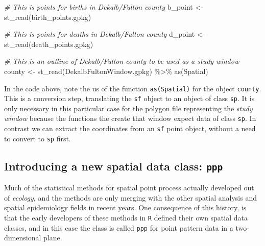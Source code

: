 \documentclass[
]{book}
\newenvironment{Shaded}{\begin{snugshade}}{\end{snugshade}}
\newcommand{\CommentTok}[1]{\textcolor[rgb]{0.56,0.35,0.01}{\textit{#1}}}
\newcommand{\FunctionTok}[1]{\textcolor[rgb]{0.00,0.00,0.00}{#1}}
\newcommand{\NormalTok}[1]{#1}
\newcommand{\OtherTok}[1]{\textcolor[rgb]{0.56,0.35,0.01}{#1}}
\newcommand{\SpecialCharTok}[1]{\textcolor[rgb]{0.00,0.00,0.00}{#1}}
\newcommand{\StringTok}[1]{\textcolor[rgb]{0.31,0.60,0.02}{#1}}
\begin{document}
\begin{Shaded}
\begin{Highlighting}[]
\CommentTok{\# This is points for births in Dekalb/Fulton county}
\NormalTok{b\_point }\OtherTok{\textless{}{-}} \FunctionTok{st\_read}\NormalTok{(}\StringTok{\textquotesingle{}birth\_points.gpkg\textquotesingle{}}\NormalTok{)}

\CommentTok{\# This is points for deaths in Dekalb/Fulton county}
\NormalTok{d\_point }\OtherTok{\textless{}{-}} \FunctionTok{st\_read}\NormalTok{(}\StringTok{\textquotesingle{}death\_points.gpkg\textquotesingle{}}\NormalTok{) }

\CommentTok{\# This is an outline of Dekalb/Fulton county to be used as a study \textquotesingle{}window\textquotesingle{}}
\NormalTok{county }\OtherTok{\textless{}{-}} \FunctionTok{st\_read}\NormalTok{(}\StringTok{\textquotesingle{}DekalbFultonWindow.gpkg\textquotesingle{}}\NormalTok{) }\SpecialCharTok{\%\textgreater{}\%}
  \FunctionTok{as}\NormalTok{(}\StringTok{\textquotesingle{}Spatial\textquotesingle{}}\NormalTok{)}
\end{Highlighting}
\end{Shaded}

In the code above, note the us of the function \texttt{as(\textquotesingle{}Spatial\textquotesingle{})} for the object \texttt{county}. This is a conversion step, translating the \texttt{sf} object to an object of class \texttt{sp}. It is only necessary in this particular case for the polygon file representing the \emph{study window} because the functions the create that window expect data of class \texttt{sp}. In contrast we can extract the coordinates from an \texttt{sf} point object, without a need to convert to \texttt{sp} first.

\hypertarget{introducing-a-new-spatial-data-class-ppp}{%
\subsection{\texorpdfstring{Introducing a new spatial data class: \texttt{ppp}}{Introducing a new spatial data class: ppp}}\label{introducing-a-new-spatial-data-class-ppp}}

Much of the statistical methods for spatial point process actually developed out of \emph{ecology}, and the methods are only merging with the other spatial analysis and spatial epidemiology fields in recent years. One consequence of this history, is that the early developers of these methods in \texttt{R} defined their own spatial data classes, and in this case the class is called \texttt{ppp} for point pattern data in a two-dimensional plane.
\end{document}

